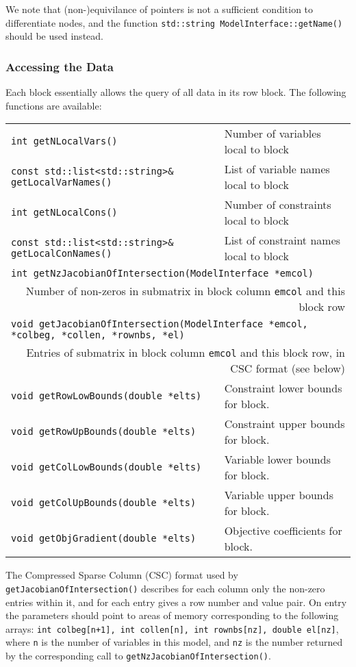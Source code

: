 \documentclass[10pt,a4paper]{book}
\begin{document}
We note that (non-)equivilance of pointers is not a sufficient condition to
differentiate nodes, and the function {\tt std::string ModelInterface::getName()} should be used instead.

\subsubsection{Accessing the Data}
Each block essentially allows the query of all data in its row block. The
following functions are available:
\begin{tabular}{ll}
{\tt int getNLocalVars()} & 
   Number of variables local to block \\
{\tt const std::list<std::string>\& getLocalVarNames()} &
   List of variable names local to block \\
{\tt int getNLocalCons()} & 
   Number of constraints local to block \\
{\tt const std::list<std::string>\& getLocalConNames()} &
   List of constraint names local to block \\
\multicolumn{2}{l}{\tt int getNzJacobianOfIntersection(ModelInterface *emcol)}\\
\multicolumn{2}{r}{Number of non-zeros in submatrix in block column {\tt emcol}
   and this block row} \\
\multicolumn{2}{l}{\tt void getJacobianOfIntersection(ModelInterface *emcol,
      *colbeg, *collen, *rownbs, *el)} \\
\multicolumn{2}{r}{Entries of submatrix in block column {\tt emcol} and this
   block row, in CSC format (see below)} \\
{\tt void getRowLowBounds(double *elts)} &
   Constraint lower bounds for block. \\
{\tt void getRowUpBounds(double *elts)} &
   Constraint upper bounds for block. \\
{\tt void getColLowBounds(double *elts)} &
   Variable lower bounds for block. \\
{\tt void getColUpBounds(double *elts)} &
   Variable upper bounds for block. \\
{\tt void getObjGradient(double *elts)} &
   Objective coefficients for block.
\end{tabular}

The Compressed Sparse Column (CSC) format used by 
{\tt getJacobianOfIntersection()} describes for each column only the non-zero
entries within it, and for each entry gives a row number and value pair. On
entry the parameters should point to areas of memory corresponding to the
following arrays: {\tt int colbeg[n+1], int collen[n], int rownbs[nz],
double el[nz]}, where {\tt n} is the number of variables in this model, and
{\tt nz} is the number returned by the corresponding call to
{\tt getNzJacobianOfIntersection()}.
\end{document}
